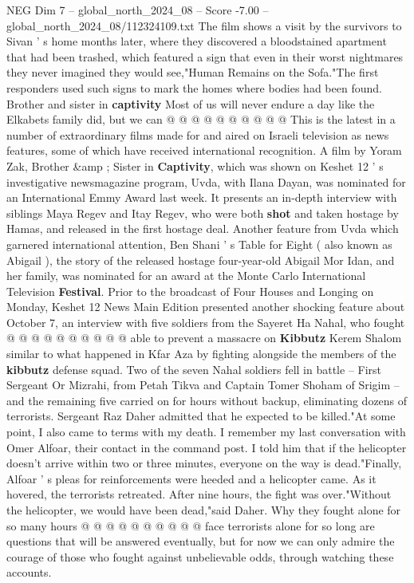 \begin{textsample}{NEG Dim 7 – global\_north\_2024\_08 – Score -7.00 – global\_north\_2024\_08/112324109.txt}
The film shows a visit by the survivors to Sivan ' s home months later, where they discovered a bloodstained apartment that had been trashed, which featured a sign that even in their worst nightmares they never imagined they would see,"Human Remains on the Sofa."The first responders used such signs to mark the homes where bodies had been found.
Brother and sister in \textbf{captivity} Most of us will never endure a day like the Elkabets family did, but we can @ @ @ @ @ @ @ @ @ @ This is the latest in a number of extraordinary films made for and aired on Israeli television as news features, some of which have received international recognition.
A film by Yoram Zak, Brother \&amp ; Sister in \textbf{Captivity}, which was shown on Keshet 12 ' s investigative newsmagazine program, Uvda, with Ilana Dayan, was nominated for an International Emmy Award last week.
It presents an in-depth interview with siblings Maya Regev and Itay Regev, who were both \textbf{shot} and taken hostage by Hamas, and released in the first hostage deal.
Another feature from Uvda which garnered international attention, Ben Shani ' s Table for Eight ( also known as Abigail ), the story of the released hostage four-year-old Abigail Mor Idan, and her family, was nominated for an award at the Monte Carlo International Television \textbf{Festival}.
Prior to the broadcast of Four Houses and Longing on Monday, Keshet 12 News Main Edition presented another shocking feature about October 7, an interview with five soldiers from the Sayeret Ha Nahal, who fought @ @ @ @ @ @ @ @ @ @ able to prevent a massacre on \textbf{Kibbutz} Kerem Shalom similar to what happened in Kfar Aza by fighting alongside the members of the \textbf{kibbutz} defense squad.
Two of the seven Nahal soldiers fell in battle -- First Sergeant Or Mizrahi, from Petah Tikva and Captain Tomer Shoham of Srigim -- and the remaining five carried on for hours without backup, eliminating dozens of terrorists.
Sergeant Raz Daher admitted that he expected to be killed."At some point, I also came to terms with my death.
I remember my last conversation with Omer Alfoar, their contact in the command post.
I told him that if the helicopter doesn't arrive within two or three minutes, everyone on the way is dead."Finally, Alfoar ' s pleas for reinforcements were heeded and a helicopter came.
As it hovered, the terrorists retreated.
After nine hours, the fight was over."Without the helicopter, we would have been dead,"said Daher.
Why they fought alone for so many hours @ @ @ @ @ @ @ @ @ @ face terrorists alone for so long are questions that will be answered eventually, but for now we can only admire the courage of those who fought against unbelievable odds, through watching these accounts.

\end{textsample}
